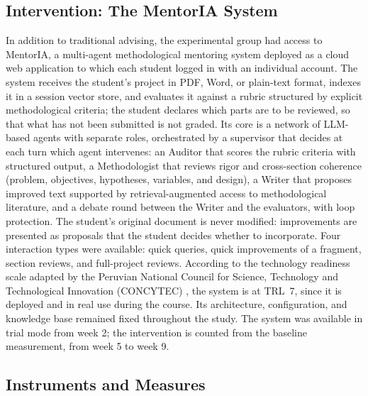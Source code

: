\documentclass[journal]{IEEEtran}
\begin{document}
\subsection{Intervention: The MentorIA System}

In addition to traditional advising, the experimental group had access to MentorIA, a multi-agent methodological mentoring system deployed as a cloud web application to which each student logged in with an individual account. The system receives the student's project in PDF, Word, or plain-text format, indexes it in a session vector store, and evaluates it against a rubric structured by explicit methodological criteria; the student declares which parts are to be reviewed, so that what has not been submitted is not graded. Its core is a network of LLM-based agents with separate roles, orchestrated by a supervisor that decides at each turn which agent intervenes: an Auditor that scores the rubric criteria with structured output, a Methodologist that reviews rigor and cross-section coherence (problem, objectives, hypotheses, variables, and design), a Writer that proposes improved text supported by retrieval-augmented access to methodological literature, and a debate round between the Writer and the evaluators, with loop protection. The student's original document is never modified: improvements are presented as proposals that the student decides whether to incorporate. Four interaction types were available: quick queries, quick improvements of a fragment, section reviews, and full-project reviews. According to the technology readiness scale adapted by the Peruvian National Council for Science, Technology and Technological Innovation (CONCYTEC) \cite{concytec2022}, the system is at TRL~7, since it is deployed and in real use during the course. Its architecture, configuration, and knowledge base remained fixed throughout the study. The system was available in trial mode from week 2; the intervention is counted from the baseline measurement, from week 5 to week 9.

\subsection{Instruments and Measures}
\end{document}
